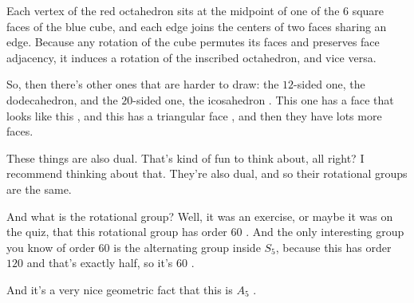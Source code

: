 \begin{content}
\begin{center}
\end{center}

\begin{steps}
Each vertex of the red octahedron sits at the midpoint of one of the $6$ square faces of the blue cube, and each edge joins the centers of two faces sharing an edge. Because any rotation of the cube permutes its faces and preserves face adjacency, it induces a rotation of the inscribed octahedron, and vice versa.
\end{steps}
\end{content}

\begin{speech}[00:23:24 - 00:24:15]
So, then there's other ones that are harder to draw: the $12$-sided one, the dodecahedron, and the $20$-sided one, the icosahedron . This one has a face that looks like this , and this has a triangular face , and then they have lots more faces.

These things are also dual. That's kind of fun to think about, all right? I recommend thinking about that. They're also dual, and so their rotational groups are the same.

And what is the rotational group? Well, it was an exercise, or maybe it was on the quiz, that this rotational group has order $60$ . And the only interesting group you know of order $60$ is the alternating group inside $S_5$, because this has order $120$ and that's exactly half, so it's $60$ .

And it's a very nice geometric fact that this is $A_5$ .
\end{speech}

